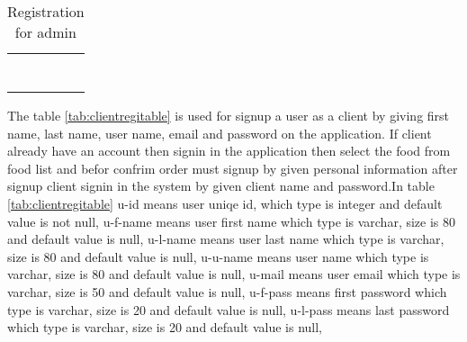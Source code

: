 \documentclass[12pt,a4paper]{article}
\newcommand\tab[1][1cm]{\hspace*{#1}}
\begin{document}
		\begin{table}[H]
		\center
	\caption{Registration for admin}
	\label{tab:adminregitable}
	\begin{tabular}{|M{2.5cm}|M{3.5cm}|M{1cm}|N}
	\hline
	\fontsize{10}{5} & \fontsize{10}{5} & \fontsize{10}{5} &\\[10pt]
	\hline
	\fontsize{10}{5}\selectfont {u-id} & \fontsize{10}{5}\selectfont {tinyint(3)} & \fontsize{10}{5}\selectfont {NO} &\\[10pt]
	\hline
	\fontsize{10}{5}\selectfont {u-f-name} & \fontsize{10}{5}\selectfont {varchar(80)} & \fontsize{10}{5}\selectfont {YES} &\\[10pt]
	\hline
	\fontsize{10}{5}\selectfont {u-l-name} & \fontsize{10}{5}\selectfont {varchar(80)} & \fontsize{10}{5}\selectfont {YES} &\\[10pt]
	\hline
	\fontsize{10}{5}\selectfont {u-u-name} & \fontsize{10}{5}\selectfont {varchar(80)} & \fontsize{10}{5}\selectfont {YES} &\\[10pt]
	\hline
	\fontsize{10}{5}\selectfont {U-mail} & \fontsize{10}{5}\selectfont {varchar(50)} & \fontsize{10}{5}\selectfont {YES} &\\[10pt]
	\hline
	\fontsize{10}{5}\selectfont {u-f-pass} & \fontsize{10}{5}\selectfont {varchar(20)} & \fontsize{10}{5}\selectfont {YES} &\\[10pt]
	\hline
	\fontsize{10}{5}\selectfont {u-l-pass} & \fontsize{10}{5}\selectfont {varchar(20)} & \fontsize{10}{5}\selectfont {YES} &\\[10pt]
	\hline
	\end{tabular}
	\end{table}\tab The table \ref{tab:clientregitable} is used for signup a user as a client by giving first name, last name, user name, email and password on the application. If client already have an account then signin in the application then select the food from food list and befor confrim order must signup by given personal information after signup client signin in the system by given client name and password.In table \ref{tab:clientregitable} u-id means user uniqe id, which type is integer and default value is not null, u-f-name means user first name which type is varchar, size is 80 and default value is null, u-l-name means user last name which type is varchar, size is 80 and default value is null, u-u-name means user name which type is varchar, size is 80 and default value is null, u-mail means user email which type is varchar, size is 50 and default value is null, u-f-pass means first password which type is varchar, size is 20 and default value is null, u-l-pass means last password which type is varchar, size is 20 and default value is null,
\end{document}

